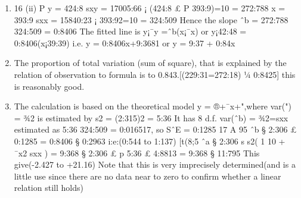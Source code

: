 \documentclass[a4paper,12pt]{article}
\begin{document}
\begin{enumerate}
\item
16
(ii) P
y = 424:8 sxy = 17005:66 ¡ (424:8 £ P 393:9)=10 = 272:788
x = 393:9 sxx = 15840:23 ¡ 393:92=10 = 324:509
Hence the slope
ˆb
=
272:788
324:509
= 0:8406
The fitted line is y¡¯y =ˆb(x¡¯x) or y¡42:48 = 0:8406(x¡39:39) i.e. y = 0:8406x+9:3681
or y = 9:37 + 0:84x
\item The proportion of total variation (sum of square), that is explained by the relation
of observation to formula is to 0.843.[(229:31=272:18) ¼ 0:8425] this is reasonably
good.
\item The calculation is based on the theoretical model y = ®+¯x+",where var(") =
¾2 is estimated by s2 = (2:315)2 = 5:36 It has 8 d.f. var(ˆb) = ¾2=sxx estimated as
5:36
324:509 = 0:016517, so SˆE = 0:1285
17
A 95%
ˆb
§ 2:306 £ 0:1285 = 0:8406 § 0:2963 i:e:(0:544 to 1:137)
[t(8;5%
ˆa § 2:306
s
s2(
1
10
+
¯x2
sxx
) = 9:368 § 2:306 £
p
5:36 £ 4:8813 = 9:368 § 11:795
This give(-2.427 to +21.16)
Note that this is very imprecisely determined(and is a little use since there are no data
near to zero to confirm whether a linear relation still holds)
\end{enumerate}
\end{document}
